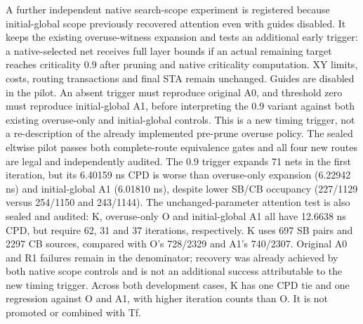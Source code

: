 \documentclass[conference,10pt]{IEEEtran}
\begin{document}
A further independent native search-scope experiment is registered because initial-global scope previously recovered attention even with guides disabled. It keeps the existing overuse-witness expansion and tests an additional early trigger: a native-selected net receives full layer bounds if an actual remaining target reaches criticality 0.9 after pruning and native criticality computation. XY limits, costs, routing transactions and final STA remain unchanged. Guides are disabled in the pilot. An absent trigger must reproduce original A0, and threshold zero must reproduce initial-global A1, before interpreting the 0.9 variant against both existing overuse-only and initial-global controls. This is a new timing trigger, not a re-description of the already implemented pre-prune overuse policy. The sealed eltwise pilot passes both complete-route equivalence gates and all four new routes are legal and independently audited. The 0.9 trigger expands 71 nets in the first iteration, but its 6.40159 ns CPD is worse than overuse-only expansion (6.22942 ns) and initial-global A1 (6.01810 ns), despite lower SB/CB occupancy (227/1129 versus 254/1150 and 243/1144). The unchanged-parameter attention test is also sealed and audited: K, overuse-only O and initial-global A1 all have 12.6638 ns CPD, but require 62, 31 and 37 iterations, respectively. K uses 697 SB pairs and 2297 CB sources, compared with O's 728/2329 and A1's 740/2307. Original A0 and R1 failures remain in the denominator; recovery was already achieved by both native scope controls and is not an additional success attributable to the new timing trigger. Across both development cases, K has one CPD tie and one regression against O and A1, with higher iteration counts than O. It is not promoted or combined with Tf.
\end{document}
